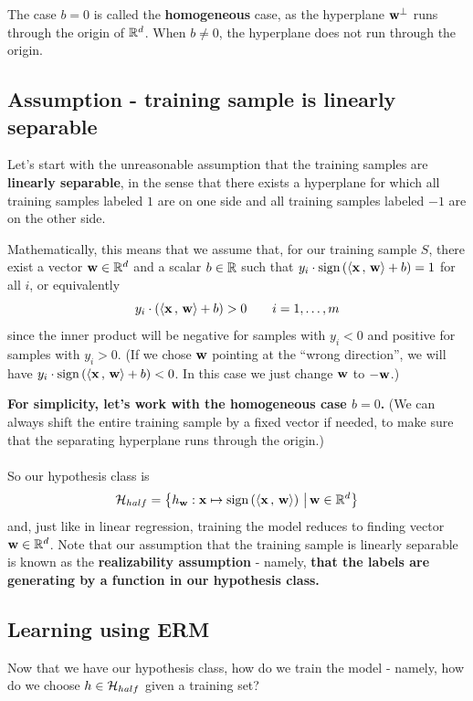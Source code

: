 The case $b=0$ is called the {\bf homogeneous} case, as the hyperplane
$\mathbf{w}^\perp$ runs through the origin of $\mathbb{R}^d$. When $b\neq 0$,  the
hyperplane does not run through the origin.

\subsection{Assumption - training sample is linearly separable}

Let's start with the
unreasonable assumption that the training samples are {\bf linearly separable},
in the sense that there exists a hyperplane for which all training samples
labeled $1$ are on one side and all training samples labeled $-1$ are on the
other side. 

Mathematically, this means that we assume that, for our training sample $S$, 
there exist a vector $\mathbf{w}\in\mathbb{R}^d$ and a scalar $b\in\mathbb{R}$ such that 
$y_i \cdot \text{sign}\left( {\left\langle \mathbf{x}\,,\,\mathbf{w} \right\rangle} + b \right) =1$ for all $i$, or
equivalently
\[
y_i \cdot \left( {\left\langle \mathbf{x}\,,\,\mathbf{w} \right\rangle} + b \right) > 0\qquad 
i=1,\ldots,m
\]
since the inner product will be negative for samples with $y_i<0$ and positive
for samples with $y_i>0$. (If we chose $\mathbf{w}$ pointing at the ``wrong
  direction'', we will have $y_i \cdot \text{sign}\left( {\left\langle \mathbf{x}\,,\,\mathbf{w} \right\rangle}
+ b \right) <0$. In this case we just change $\mathbf{w}$ to $-\mathbf{w}$.)

{\bf For simplicity, let's work with
the homogeneous case $b=0$.} (We can always shift the entire training sample by a
  fixed vector if needed, to make sure that the separating hyperplane runs
through the origin.)
\\~\\
So our hypothesis class is 
\[
  \mathcal{H}_{half} = \left\{  h_{\mathbf{w}}: \mathbf{x} \mapsto \text{sign}\left( {\left\langle \mathbf{x}\,,\,\mathbf{w} \right\rangle}  \right)
\,\big|\, \mathbf{w}\in \mathbb{R}^d \right\}
\]
and, just like in linear regression, training the model reduces to finding
vector $\mathbf{w}\in\mathbb{R}^d$. Note that our assumption that the training sample is
linearly separable is known as the {\bf realizability assumption} - namely, {\bf that
the labels are generating by a function in our hypothesis class.}

\subsection{Learning using ERM}

Now that we have our hypothesis class, how do we train the model - namely, how
do we choose $h\in\mathcal{H}_{half}$ given a training set?

